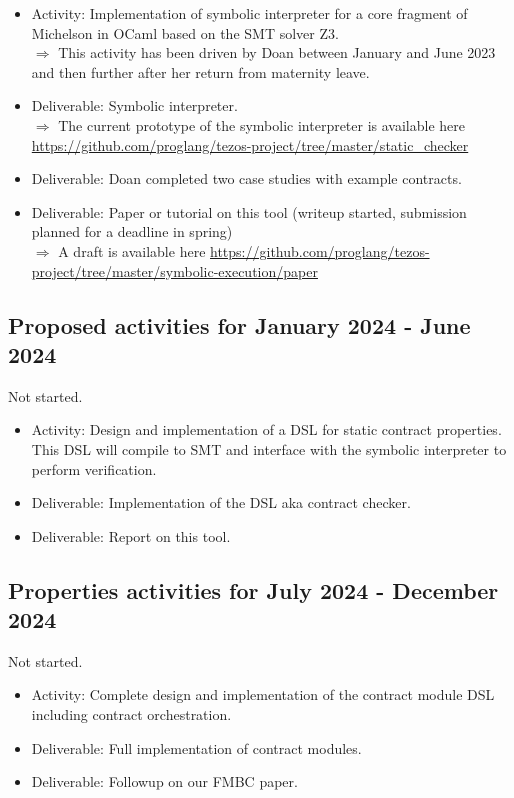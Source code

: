 \documentclass[a4paper,11pt]{article}
\begin{document}
\begin{itemize}
\item Activity: Implementation of symbolic interpreter for a core
  fragment of Michelson in OCaml based on the SMT solver Z3. \\
  $\Rightarrow$ This activity has been driven by Doan between January and June
  2023 and then further after her return from maternity leave. 
\item Deliverable: Symbolic interpreter. \\
  $\Rightarrow$ The current prototype of the symbolic interpreter is available here
  \url{https://github.com/proglang/tezos-project/tree/master/static_checker}
\item Deliverable: Doan completed two case studies with example contracts.
\item Deliverable: Paper or tutorial on this tool (writeup started,
  submission planned for a deadline in spring) \\
  $\Rightarrow$ A draft is available here \url{https://github.com/proglang/tezos-project/tree/master/symbolic-execution/paper}
\end{itemize}

\subsection{Proposed activities for January 2024 - June 2024}
\label{sec:january-2024-june}

Not started.

\begin{itemize}
\item Activity: Design and implementation of a DSL for static contract properties. This DSL will compile to SMT and interface with the symbolic interpreter to perform verification.  
\item Deliverable: Implementation of the DSL aka contract checker.
\item Deliverable: Report on this tool.
\end{itemize}

\subsection{Properties activities for July 2024 - December 2024}
\label{sec:july-2024-december}

Not started.

\begin{itemize}
\item Activity: Complete design and implementation of the contract module DSL including contract orchestration. 
\item Deliverable: Full implementation of contract modules.
\item Deliverable: Followup on our FMBC paper. 
\end{itemize}



\end{document}
